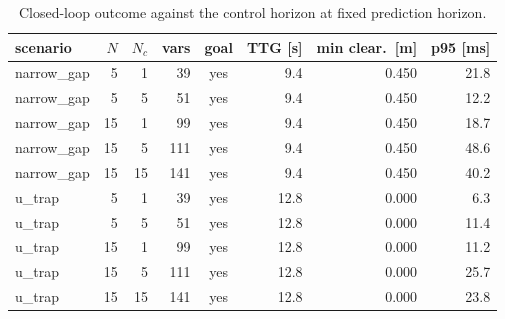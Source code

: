 \begin{table}[htbp]
  \centering
  \small
  \caption{Closed-loop outcome against the control horizon at fixed prediction horizon.}
  \label{res:tab:nc}
  \begin{tabular}{lrrrcrrr}
    \toprule
    scenario & $N$ & $N_c$ & vars & goal & TTG [s] & min clear.\ [m] & p95 [ms] \\
    \midrule
    narrow\_gap & 5 & 1 & 39 & yes & 9.4 & 0.450 & 21.8 \\
    narrow\_gap & 5 & 5 & 51 & yes & 9.4 & 0.450 & 12.2 \\
    narrow\_gap & 15 & 1 & 99 & yes & 9.4 & 0.450 & 18.7 \\
    narrow\_gap & 15 & 5 & 111 & yes & 9.4 & 0.450 & 48.6 \\
    narrow\_gap & 15 & 15 & 141 & yes & 9.4 & 0.450 & 40.2 \\
    u\_trap & 5 & 1 & 39 & yes & 12.8 & 0.000 & 6.3 \\
    u\_trap & 5 & 5 & 51 & yes & 12.8 & 0.000 & 11.4 \\
    u\_trap & 15 & 1 & 99 & yes & 12.8 & 0.000 & 11.2 \\
    u\_trap & 15 & 5 & 111 & yes & 12.8 & 0.000 & 25.7 \\
    u\_trap & 15 & 15 & 141 & yes & 12.8 & 0.000 & 23.8 \\
    \bottomrule
  \end{tabular}
\end{table}

